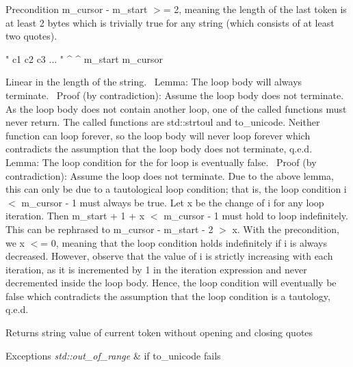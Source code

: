 \begin{DoxyPrecond}{Precondition}
{\ttfamily m\+\_\+cursor -\/ m\+\_\+start $>$= 2}, meaning the length of the last token is at least 2 bytes which is trivially true for any string (which consists of at least two quotes). \begin{DoxyVerb}" c1 c2 c3 ... "
^                ^
m_start          m_cursor
\end{DoxyVerb}

\end{DoxyPrecond}
Linear in the length of the string.~\newline
 Lemma\+: The loop body will always terminate.~\newline
 Proof (by contradiction)\+: Assume the loop body does not terminate. As the loop body does not contain another loop, one of the called functions must never return. The called functions are {\ttfamily std\+::strtoul} and to\+\_\+unicode. Neither function can loop forever, so the loop body will never loop forever which contradicts the assumption that the loop body does not terminate, q.\+e.\+d.~\newline
 Lemma\+: The loop condition for the for loop is eventually false.~\newline
 Proof (by contradiction)\+: Assume the loop does not terminate. Due to the above lemma, this can only be due to a tautological loop condition; that is, the loop condition i $<$ m\+\_\+cursor -\/ 1 must always be true. Let x be the change of i for any loop iteration. Then m\+\_\+start + 1 + x $<$ m\+\_\+cursor -\/ 1 must hold to loop indefinitely. This can be rephrased to m\+\_\+cursor -\/ m\+\_\+start -\/ 2 $>$ x. With the precondition, we x $<$= 0, meaning that the loop condition holds indefinitely if i is always decreased. However, observe that the value of i is strictly increasing with each iteration, as it is incremented by 1 in the iteration expression and never decremented inside the loop body. Hence, the loop condition will eventually be false which contradicts the assumption that the loop condition is a tautology, q.\+e.\+d.

\begin{DoxyReturn}{Returns}
string value of current token without opening and closing quotes 
\end{DoxyReturn}

\begin{DoxyExceptions}{Exceptions}
{\em std\+::out\+\_\+of\+\_\+range} & if to\+\_\+unicode fails \\
\hline
\end{DoxyExceptions}
\mbox{\label{classnlohmann_1_1basic__json_1_1lexer_afa23a2d0ad20b047487d388fd4e75657}} 
